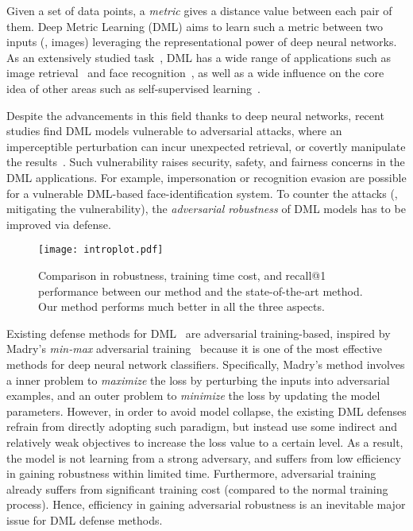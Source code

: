 \documentclass[10pt,twocolumn,letterpaper]{article}
\begin{document}

Given a set of data points, a \emph{metric} gives a distance value between each
pair of them.
%
Deep Metric Learning (DML) aims to learn such a metric between two inputs (\eg,
images) leveraging the representational power of deep neural networks.
%
As an extensively studied task~\cite{revisiting}, DML has a wide range of
applications such as image retrieval~\cite{imagesim2} and face
recognition~\cite{facenet,domainface}, as well as a wide influence on the core
idea of other areas such as self-supervised learning~\cite{dmlreality}.

Despite the advancements in this field thanks to deep neural
networks, recent studies find DML models vulnerable to
adversarial attacks, where an imperceptible perturbation can incur unexpected
retrieval, or covertly manipulate the results~\cite{advrank,advorder}.
%
Such vulnerability raises security, safety, and fairness concerns in the
DML applications.
%
For example, impersonation or recognition evasion are possible for a
vulnerable DML-based face-identification system.
%
To counter the attacks (\ie, mitigating the vulnerability), the
\emph{adversarial robustness} of DML models has to be improved via defense.

\begin{figure}[t]
	\texttt{[image: introplot.pdf]}
	\caption{
		Comparison in robustness, training time cost, and recall@1 performance
		between our method and the state-of-the-art method.
		Our method performs much better in all the three aspects.
	}
	\label{fig:introplot}
\end{figure}


Existing defense methods for DML~\cite{advrank,robrank} are adversarial
training-based, inspired by Madry's \emph{min-max} adversarial
training~\cite{madry} because it is one of the most effective methods for deep
neural network classifiers.
%
Specifically, Madry's method involves a inner problem to \emph{maximize} the
loss by perturbing the inputs into adversarial examples, and an outer problem
to \emph{minimize} the loss by updating the model parameters.
%
However, in order to avoid model collapse, the existing DML defenses refrain
from directly adopting such paradigm, but instead use some indirect and
relatively weak objectives to increase the loss value to a certain level.
%
As a result, the model is not learning from a strong adversary, and suffers
from low efficiency in gaining robustness within limited time. 
%
Furthermore, adversarial training already suffers from significant training
cost (compared to the normal training process).
%
Hence, efficiency in gaining adversarial robustness is an inevitable major
issue for DML defense methods.
\end{document}
